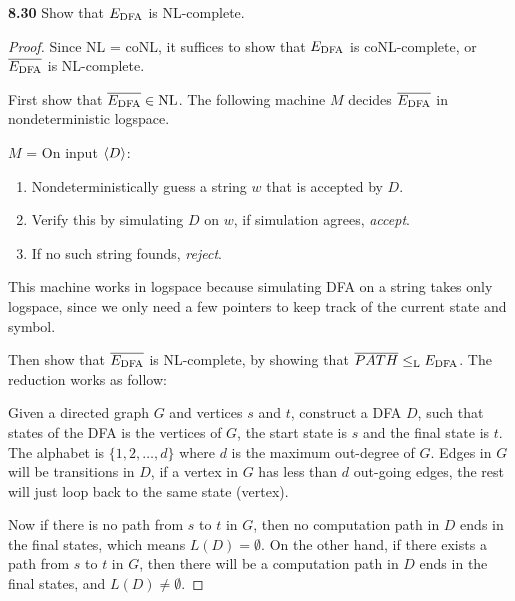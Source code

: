 \label{lang:EDFA_NLC}
\textbf{8.30} Show that $E_{\text{DFA}}$ is NL-complete.
\begin{mdframed}
\begin{proof}
Since NL = coNL, it suffices to show that $E_{\text{DFA}}$ is coNL-complete, or $\overline{E_{\text{DFA}}}$ is NL-complete. 

First show that $\overline{E_{\text{DFA}}} \in \text{NL}$. The following machine $M$ decides $\overline{E_{\text{DFA}}}$ in nondeterministic logspace.

\medskip
$M$ = On input $\langle{D}\rangle$:
\begin{enumerate}
\item Nondeterministically guess a string $w$ that is accepted by $D$.
\item Verify this by simulating $D$ on $w$, if simulation agrees, \textit{accept}.
\item If no such string founds, \textit{reject}.
\end{enumerate}
This machine works in logspace because simulating DFA on a string takes only logspace, since we only need a few pointers to keep track of the current state and symbol.

\medskip
Then show that $\overline{E_{\text{DFA}}}$ is NL-complete, by showing that $\overline{PATH} \leq_{\text{L}} E_{\text{DFA}}$. The reduction works as follow:

Given a directed graph $G$ and vertices $s$ and $t$, construct a DFA $D$, such that states of the DFA is the vertices of $G$, the start state is $s$ and the final state is $t$. The alphabet is $\{1, 2, \ldots, d\}$ where $d$ is the maximum out-degree of $G$. Edges in $G$ will be transitions in $D$, if a vertex in $G$ has less than $d$ out-going edges, the rest will just loop back to the same state (vertex).

Now if there is no path from $s$ to $t$ in $G$, then no computation path in $D$ ends in the final states, which means $L(D) = \emptyset$. On the other hand, if there exists a path from $s$ to $t$ in $G$, then there will be a computation path in $D$ ends in the final states, and $L(D) \neq \emptyset$.
\end{proof}
\end{mdframed}


